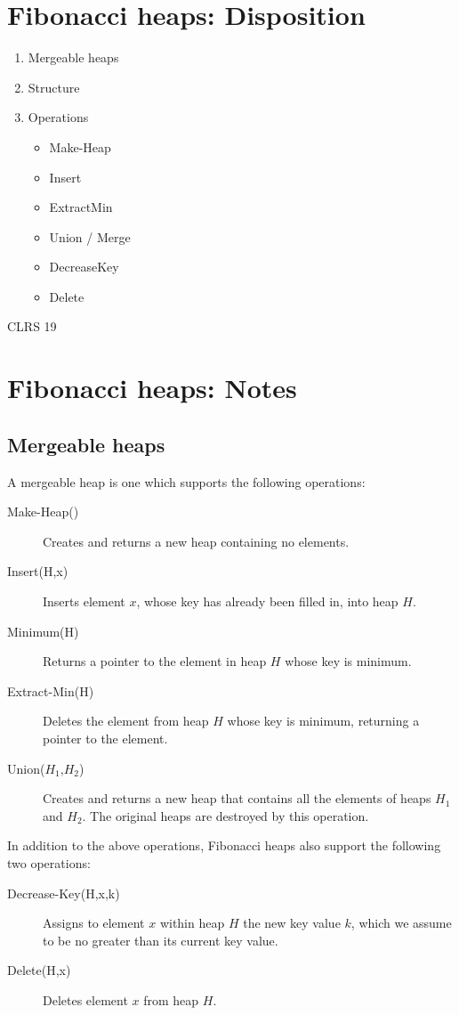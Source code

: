 \section{Fibonacci heaps: Disposition}
\begin{enumerate}
	\item Mergeable heaps
	\item Structure
	\item Operations
	\begin{itemize}
		\item Make-Heap
		\item Insert
		\item ExtractMin
		\item Union / Merge
		\item DecreaseKey
		\item Delete
	\end{itemize}
\end{enumerate}

CLRS 19

\section{Fibonacci heaps: Notes}

\subsection{Mergeable heaps}
A mergeable heap is one which supports the following operations:
%
\begin{description}
	\item[Make-Heap()] Creates and returns a new heap containing no elements.
	\item[Insert(H,x)] Inserts element $x$, whose key has already been filled in,
	into heap $H$.
	\item[Minimum(H)] Returns a pointer to the element in heap $H$ whose key is minimum.
	\item[Extract-Min(H)] Deletes the element from heap $H$ whose key is minimum,
	returning a pointer to the element.
	\item[Union($H_1$,$H_2$)] Creates and returns a new heap
	that contains all the elements of heaps $H_1$ and $H_2$.
	The original heaps are destroyed by this operation.
\end{description}
%
In addition to the above operations, Fibonacci heaps also
support the following two operations:
%
\begin{description}
	\item[Decrease-Key(H,x,k)] Assigns to element $x$ within
	heap $H$ the new key value $k$, which we assume to be no
	greater than its current key value.
	\item[Delete(H,x)] Deletes element $x$ from heap $H$.
\end{description}

